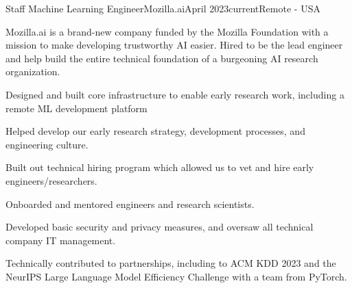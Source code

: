 \documentclass[print]{friggeri-cv} %
\begin{document}


\begin{job}
  {}{Staff Machine Learning Engineer}{Mozilla.ai}{April 2023}{current}{Remote - USA}{
    Mozilla.ai is a brand-new company funded by the Mozilla Foundation with a
    mission to make developing trustworthy AI easier. Hired to be the lead
    engineer and help build the entire technical foundation of a burgeoning AI research organization.
    
    \begin{myitemize}
      \item Designed and built core infrastructure to enable early research work, including a remote ML development platform
      \item Helped develop our early research strategy, development processes, and engineering culture.
      \item Built out technical hiring program which allowed us to vet and hire early engineers/researchers.
      \item Onboarded and mentored engineers and research scientists.
      \item Developed basic security and privacy measures, and oversaw all technical company IT management.
      \item Technically contributed to partnerships, including to ACM KDD 2023\autocite{kdd_2023_workshop} and the NeurIPS Large Language Model Efficiency Challenge\autocite{neurips_llm_efficiency_2023}
      with a team from PyTorch.
    \end{myitemize}
  }
\end{job}
\end{document}
